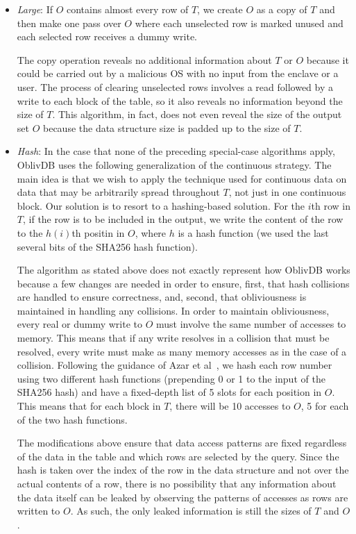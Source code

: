 \documentclass[letterpaper,twocolumn,10pt]{article}
\def\name/{OblivDB}
\begin{document}
\begin{itemize}[itemsep=0pt,parsep=0pt]
\item \textit{Large}: If $O$ contains almost every row of $T$, we create $O$ as a copy of $T$ and then make one pass over $O$ where each unselected row is marked unused and each selected row receives a dummy write. 

The copy operation reveals no additional information about $T$ or $O$ because it could be carried out by a malicious OS with no input from the enclave or a user. The process of clearing unselected rows involves a read followed by a write to each block of the table, so it also reveals no information beyond the size of $T$. This algorithm, in fact, does not even reveal the size of the output set $O$ because the data structure size is padded up to the size of $T$. 

\item \textit{Hash}: In the case that none of the preceding special-case algorithms apply, \name/ uses the following generalization of the continuous strategy. The main idea is that we wish to apply the technique used for continuous data on data that may be arbitrarily spread throughout $T$, not just in one continuous block. Our solution is to resort to a hashing-based solution. For the $i$th row in $T$, if the row is to be included in the output, we write the content of the row to the $h(i)$th positin in $O$, where $h$ is a hash function (we used the last several bits of the SHA256 hash function).

The algorithm as stated above does not exactly represent how \name/ works because a few changes are needed in order to ensure, first, that hash collisions are handled to ensure correctness, and, second, that obliviousness is maintained in handling any collisions. In order to maintain obliviousness, every real or dummy write to $O$ must involve the same number of accesses to memory. This means that if any write resolves in a collision that must be resolved, every write must make as many memory accesses as in the case of a collision. Following the guidance of Azar et al~\cite{ABKU99}, we hash each row number using two different hash functions (prepending 0 or 1 to the input of the SHA256 hash) and have a fixed-depth list of 5 slots for each position in $O$. This means that for each block in $T$, there will be 10 accesses to $O$, 5 for each of the two hash functions. 

The modifications above ensure that data access patterns are fixed regardless of the data in the table and which rows are selected by the query. Since the hash is taken over the index of the row in the data structure and not over the actual contents of a row, there is no possibility that any information about the data itself can be leaked by observing the patterns of accesses as rows are written to $O$. As such, the only leaked information is still the sizes of $T$ and $O$. 


\end{itemize}
\end{document}
